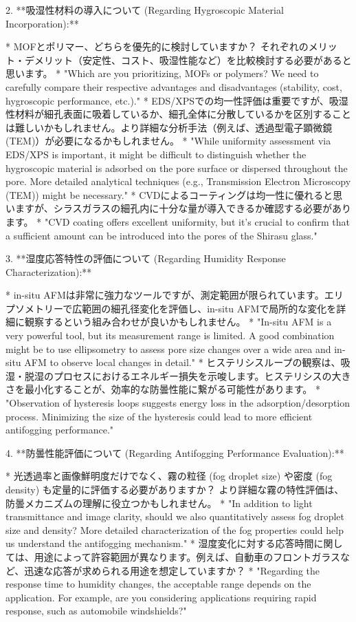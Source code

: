 \documentclass{article}
\begin{document}
2. **吸湿性材料の導入について (Regarding Hygroscopic Material Incorporation):**

    *   MOFとポリマー、どちらを優先的に検討していますか？ それぞれのメリット・デメリット（安定性、コスト、吸湿性能など）を比較検討する必要があると思います。
        *   "Which are you prioritizing, MOFs or polymers? We need to carefully compare their respective advantages and disadvantages (stability, cost, hygroscopic performance, etc.)."
    *   EDS/XPSでの均一性評価は重要ですが、吸湿性材料が細孔表面に吸着しているか、細孔全体に分散しているかを区別することは難しいかもしれません。より詳細な分析手法（例えば、透過型電子顕微鏡(TEM)）が必要になるかもしれません。
        *   "While uniformity assessment via EDS/XPS is important, it might be difficult to distinguish whether the hygroscopic material is adsorbed on the pore surface or dispersed throughout the pore. More detailed analytical techniques (e.g., Transmission Electron Microscopy (TEM)) might be necessary."
    *   CVDによるコーティングは均一性に優れると思いますが、シラスガラスの細孔内に十分な量が導入できるか確認する必要があります。
        *   "CVD coating offers excellent uniformity, but it's crucial to confirm that a sufficient amount can be introduced into the pores of the Shirasu glass."

3. **湿度応答特性の評価について (Regarding Humidity Response Characterization):**

    *   in-situ AFMは非常に強力なツールですが、測定範囲が限られています。エリプソメトリーで広範囲の細孔径変化を評価し、in-situ AFMで局所的な変化を詳細に観察するという組み合わせが良いかもしれません。
        *   "In-situ AFM is a very powerful tool, but its measurement range is limited. A good combination might be to use ellipsometry to assess pore size changes over a wide area and in-situ AFM to observe local changes in detail."
    *   ヒステリシスループの観察は、吸湿・脱湿のプロセスにおけるエネルギー損失を示唆します。ヒステリシスの大きさを最小化することが、効率的な防曇性能に繋がる可能性があります。
        *   "Observation of hysteresis loops suggests energy loss in the adsorption/desorption process. Minimizing the size of the hysteresis could lead to more efficient antifogging performance."

4. **防曇性能評価について (Regarding Antifogging Performance Evaluation):**

    *   光透過率と画像鮮明度だけでなく、霧の粒径 (fog droplet size) や密度 (fog density) も定量的に評価する必要がありますか？ より詳細な霧の特性評価は、防曇メカニズムの理解に役立つかもしれません。
        *   "In addition to light transmittance and image clarity, should we also quantitatively assess fog droplet size and density? More detailed characterization of the fog properties could help us understand the antifogging mechanism."
    *   湿度変化に対する応答時間に関しては、用途によって許容範囲が異なります。例えば、自動車のフロントガラスなど、迅速な応答が求められる用途を想定していますか？
        *   "Regarding the response time to humidity changes, the acceptable range depends on the application. For example, are you considering applications requiring rapid response, such as automobile windshields?"
\end{document}
